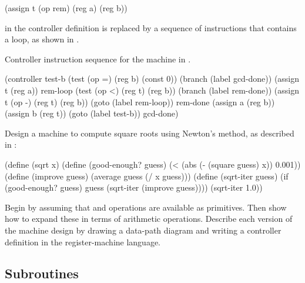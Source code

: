 \begin{codeBlock}
(assign t (op rem) (reg a) (reg b))
\end{codeBlock}

\noindent
in the  controller definition is replaced by a sequence of
instructions that contains a loop, as shown in .

\begin{codeFigure}
  {%
    Controller instruction sequence for the  machine in
    .
  }%
\begin{codeBlock}
(controller test-b
              (test (op =) (reg b) (const 0))
              (branch (label gcd-done))
              (assign t (reg a))
            rem-loop
              (test (op <) (reg t) (reg b))
              (branch (label rem-done))
              (assign t (op -) (reg t) (reg b))
              (goto (label rem-loop))
            rem-done
              (assign a (reg b))
              (assign b (reg t))
              (goto (label test-b))
            gcd-done)
\end{codeBlock}
\end{codeFigure}

\begin{exerciseGroup}
\label{Exercise 5.3}
 Design a machine to compute square
roots using Newton's method, as described in :

\begin{codeBlock}
(define (sqrt x)
  (define (good-enough? guess)
    (< (abs (- (square guess) x)) 0.001))
  (define (improve guess)
    (average guess (/ x guess)))
  (define (sqrt-iter guess)
    (if (good-enough? guess)
        guess
        (sqrt-iter (improve guess))))
  (sqrt-iter 1.0))
\end{codeBlock}

Begin by assuming that  and  operations are
available as primitives.  Then show how to expand these in terms of arithmetic
operations.  Describe each version of the  machine design by drawing
a data-path diagram and writing a controller definition in the register-machine
language.
\end{exerciseGroup}

\subsection{Subroutines}
\label{Section 5.1.3}

